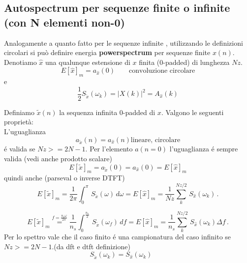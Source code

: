 \documentclass[11pt,a4paper,DIV12,BCOR1.5mm]{scrartcl}
\begin{document}
\subsection{Autospectrum per sequenze finite o infinite (con N elementi non-0)}
Analogamente a quanto fatto per le sequenze infinite , utilizzando le definizioni circolari si  può definire energia \textbf{powerspectrum} per sequenze finite $x(n)$. Denotiamo $\hat{x}$  una qualunque estensione  di $x$ finita (0-padded) di lunghezza $Nz$.\\
\begin{equation}
E[\hat{x}]_m = a_{\hat{x}}(0) \qquad \textrm{convoluzione circolare}
\end{equation}
e
\begin{equation}
\frac{1}{2}S_{\tilde{x}}(\omega_k) = |X(k)|^2 =  A_{\hat{x}}(k)
\end{equation}

Definiamo $\tilde x(n) $ la sequenza infinita 0-padded  di $x$.  Valgono le seguenti  proprietà:\\
 
L'uguaglianza 
\begin{equation}
a_{\tilde{x}}(n) =  a_{\hat{x}}(n) \textrm{lineare, circolare}
\end{equation}
 é valida se $Nz>=2N-1$. Per l'elemento $a(n=0)$ l'uguaglianza é sempre valida (vedi anche prodotto scalare)
\begin{equation}
E[\tilde{x}]_m = a_{\tilde{x}}(0) =  a_{\hat{x}}(0) = E[\hat{x}]_m 
\end{equation}
quindi anche (parseval o inverse DTFT)
\begin{equation}
E[\tilde{x}]_m =  \frac{1}{2\pi}\int_0^\pi\,S_{\tilde{x}}(\omega)\,d\omega = E[\hat{x}]_m =  \frac{1}{Nz}\sum_k^{Nz/2}\,S_{\hat{x}}(\omega_k)\,.
\end{equation}

\begin{equation}
E[\tilde{x}]_m \overset{f = \frac{n_s \omega}{2\pi}}{=} \frac{1}{n_s}\int_0^\frac{n_s}{2}\,S_{\tilde{x}}(\omega_f)\,df = E[\hat{x}]_m =  \frac{1}{n_s}\sum_k^{Nz/2}\,S_{\hat{x}}(\omega_k)\Delta f\,.
\end{equation}
Per lo spettro vale che il caso finito é una campionatura del caso infinito se $Nz>=2N-1$.(da dft e dtft definizione)
\begin{equation}
S_{\tilde{x}}(\omega_k) = S_{\hat{x}}(\omega_k) \qquad 
\end{equation}
\end{document}
